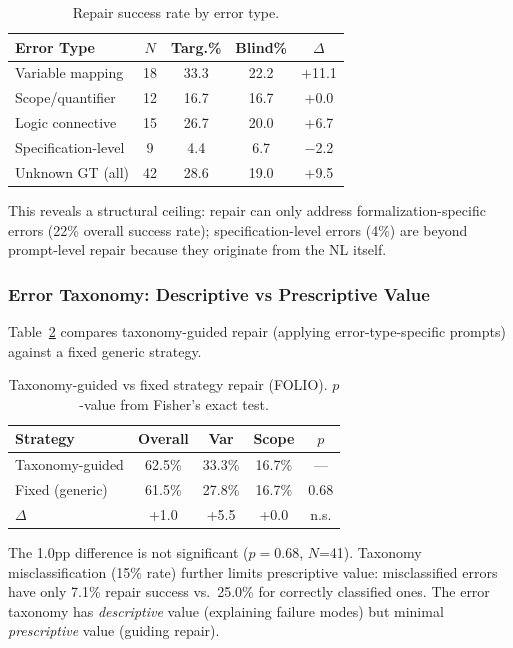\documentclass[11pt,a4paper]{article}
\begin{document}
\begin{table}[t]
\centering
\small
\caption{Repair success rate by error type.}
\label{tab:repair_type}
\begin{tabular}{lcccc}
\toprule
\textbf{Error Type} & $N$ & \textbf{Targ.\%} & \textbf{Blind\%} & $\Delta$ \\
\midrule
Variable mapping & 18 & 33.3 & 22.2 & +11.1 \\
Scope/quantifier & 12 & 16.7 & 16.7 & +0.0 \\
Logic connective & 15 & 26.7 & 20.0 & +6.7 \\
Specification-level & 9 & 4.4 & 6.7 & $-$2.2 \\
Unknown GT (all) & 42 & 28.6 & 19.0 & +9.5 \\
\bottomrule
\end{tabular}
\end{table}

This reveals a structural ceiling: repair can only address formalization-specific errors (22\% overall success rate); specification-level errors (4\%) are beyond prompt-level repair because they originate from the NL itself.

\subsubsection{Error Taxonomy: Descriptive vs Prescriptive Value}

Table~\ref{tab:taxonomy} compares taxonomy-guided repair (applying error-type-specific prompts) against a fixed generic strategy.

\begin{table}[t]
\centering
\small
\caption{Taxonomy-guided vs fixed strategy repair (FOLIO). $p$-value from Fisher's exact test.}
\label{tab:taxonomy}
\begin{tabular}{lcccc}
\toprule
\textbf{Strategy} & \textbf{Overall} & \textbf{Var} & \textbf{Scope} & $p$ \\
\midrule
Taxonomy-guided & 62.5\% & 33.3\% & 16.7\% & --- \\
Fixed (generic) & 61.5\% & 27.8\% & 16.7\% & 0.68 \\
$\Delta$ & +1.0 & +5.5 & +0.0 & n.s. \\
\bottomrule
\end{tabular}
\end{table}

The 1.0pp difference is not significant ($p=0.68$, $N$=41). Taxonomy misclassification (15\% rate) further limits prescriptive value: misclassified errors have only 7.1\% repair success vs.\ 25.0\% for correctly classified ones. The error taxonomy has \textit{descriptive} value (explaining failure modes) but minimal \textit{prescriptive} value (guiding repair).
\end{document}
